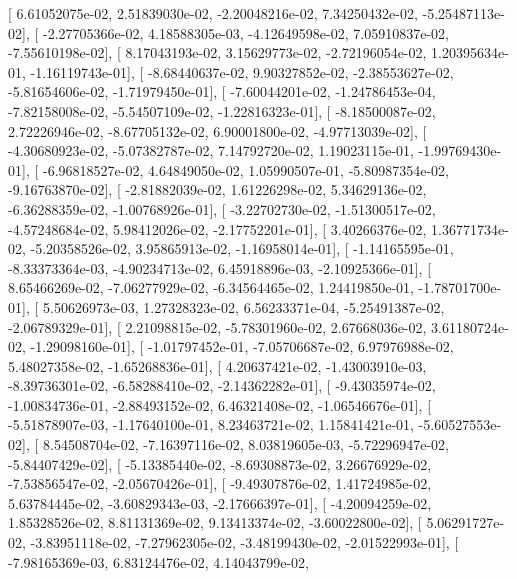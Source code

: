 \documentclass{article}
\begin{document}
       [  6.61052075e-02,   2.51839030e-02,  -2.20048216e-02,
          7.34250432e-02,  -5.25487113e-02],
       [ -2.27705366e-02,   4.18588305e-03,  -4.12649598e-02,
          7.05910837e-02,  -7.55610198e-02],
       [  8.17043193e-02,   3.15629773e-02,  -2.72196054e-02,
          1.20395634e-01,  -1.16119743e-01],
       [ -8.68440637e-02,   9.90327852e-02,  -2.38553627e-02,
         -5.81654606e-02,  -1.71979450e-01],
       [ -7.60044201e-02,  -1.24786453e-04,  -7.82158008e-02,
         -5.54507109e-02,  -1.22816323e-01],
       [ -8.18500087e-02,   2.72226946e-02,  -8.67705132e-02,
          6.90001800e-02,  -4.97713039e-02],
       [ -4.30680923e-02,  -5.07382787e-02,   7.14792720e-02,
          1.19023115e-01,  -1.99769430e-01],
       [ -6.96818527e-02,   4.64849050e-02,   1.05990507e-01,
         -5.80987354e-02,  -9.16763870e-02],
       [ -2.81882039e-02,   1.61226298e-02,   5.34629136e-02,
         -6.36288359e-02,  -1.00768926e-01],
       [ -3.22702730e-02,  -1.51300517e-02,  -4.57248684e-02,
          5.98412026e-02,  -2.17752201e-01],
       [  3.40266376e-02,   1.36771734e-02,  -5.20358526e-02,
          3.95865913e-02,  -1.16958014e-01],
       [ -1.14165595e-01,  -8.33373364e-03,  -4.90234713e-02,
          6.45918896e-03,  -2.10925366e-01],
       [  8.65466269e-02,  -7.06277929e-02,  -6.34564465e-02,
          1.24419850e-01,  -1.78701700e-01],
       [  5.50626973e-03,   1.27328323e-02,   6.56233371e-04,
         -5.25491387e-02,  -2.06789329e-01],
       [  2.21098815e-02,  -5.78301960e-02,   2.67668036e-02,
          3.61180724e-02,  -1.29098160e-01],
       [ -1.01797452e-01,  -7.05706687e-02,   6.97976988e-02,
          5.48027358e-02,  -1.65268836e-01],
       [  4.20637421e-02,  -1.43003910e-03,  -8.39736301e-02,
         -6.58288410e-02,  -2.14362282e-01],
       [ -9.43035974e-02,  -1.00834736e-01,  -2.88493152e-02,
          6.46321408e-02,  -1.06546676e-01],
       [ -5.51878907e-03,  -1.17640100e-01,   8.23463721e-02,
          1.15841421e-01,  -5.60527553e-02],
       [  8.54508704e-02,  -7.16397116e-02,   8.03819605e-03,
         -5.72296947e-02,  -5.84407429e-02],
       [ -5.13385440e-02,  -8.69308873e-02,   3.26676929e-02,
         -7.53856547e-02,  -2.05670426e-01],
       [ -9.49307876e-02,   1.41724985e-02,   5.63784445e-02,
         -3.60829343e-03,  -2.17666397e-01],
       [ -4.20094259e-02,   1.85328526e-02,   8.81131369e-02,
          9.13413374e-02,  -3.60022800e-02],
       [  5.06291727e-02,  -3.83951118e-02,  -7.27962305e-02,
         -3.48199430e-02,  -2.01522993e-01],
       [ -7.98165369e-03,   6.83124476e-02,   4.14043799e-02,
\end{document}
